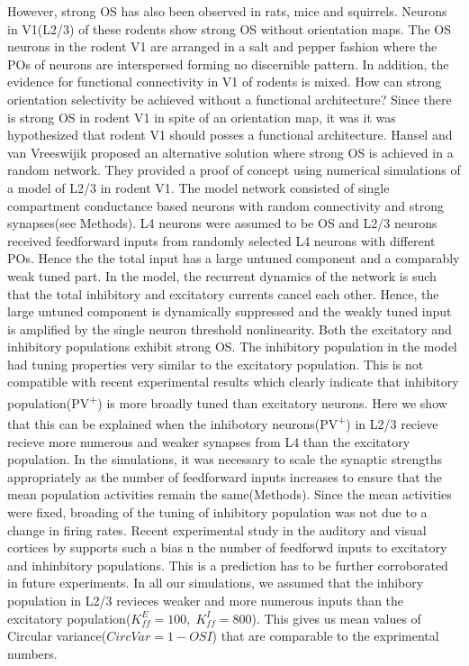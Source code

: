 However, strong OS has also been observed in rats, mice and squirrels. Neurons in V1(L2/3) of these rodents show strong OS without orientation maps. The OS neurons in the rodent V1 are arranged in a salt and pepper fashion where the POs of neurons are interspersed forming no discernible pattern. In addition, the evidence for functional connectivity in V1 of rodents is mixed. How can strong orientation selectivity be achieved without a functional architecture? Since there is strong OS in rodent V1 in spite of an orientation map, it was it was hypothesized that rodent V1 should posses a functional architecture. Hansel and van Vreeswijik \cite{Hansel2012} proposed an alternative solution where strong OS is achieved in a random network. They provided a proof of concept using numerical simulations of a model of L2/3 in rodent V1. The model network consisted of single compartment conductance based neurons with random connectivity and strong synapses(see Methods). L4 neurons were assumed to be OS and L2/3 neurons received feedforward inputs from randomly selected L4 neurons with different POs. Hence the the total input has a large untuned component and a comparably weak tuned part. In the model, the recurrent dynamics of the network is such that the total inhibitory and excitatory currents cancel each other. Hence, the large untuned component is dynamically suppressed and the weakly tuned input is amplified by the single neuron threshold nonlinearity. Both the excitatory and inhibitory populations exhibit strong OS. The inhibitory population in the model had tuning properties very similar to the excitatory population. This is not compatible with recent experimental results which clearly indicate that inhibitory population(PV\textsuperscript{+}) is more broadly tuned than excitatory neurons. Here we show that this can be explained when the inhibotory neurons(PV\textsuperscript{+}) in L2/3 recieve recieve more numerous and weaker synapses from L4 than the excitatory population. In the simulations, it was necessary to scale the synaptic strengths appropriately as the number of feedforward inputs increases to ensure that the mean population activities remain the same(Methods). Since the mean activities were fixed, broading of the tuning of inhibitory population was not due to a change in firing rates. Recent experimental study in the auditory and visual cortices by \cite{} supports such a bias n the number of feedforwd inputs to excitatory and inhinbitory populations. This is a prediction has to be further corroborated in future experiments. In all our simulations, we assumed that the inhibory population in L2/3 revieces weaker and more numerous inputs than the excitatory population($K_{ff}^{E} = 100, \; K_{ff}^{I} = 800$). This gives us mean values of Circular variance($CircVar = 1 - OSI$) that are comparable to the exprimental numbers. 


